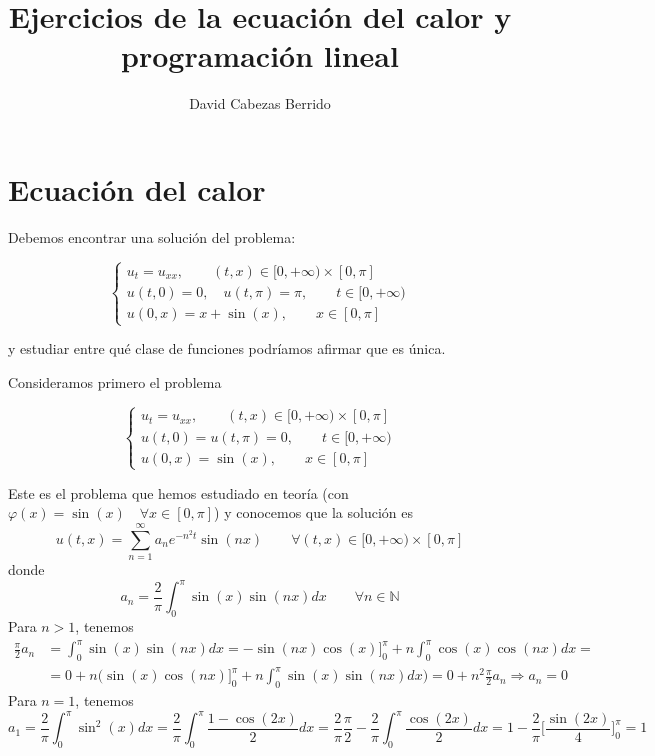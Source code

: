 \documentclass[a4]{article}
\title{Ejercicios de la ecuación del calor y programación lineal}
\author{David Cabezas Berrido}
\date{\vspace{-4mm}}
\begin{document}
\maketitle

\section{Ecuación del calor}

Debemos encontrar una solución del problema:

\begin{equation} \label{eq:enunciado}
  \begin{cases}
    u_t=u_{xx}, \qquad (t,x)\in [0,+\infty)\times [0,\pi] \\
    u(t,0)=0,\quad u(t,\pi)=\pi, \qquad t\in [0,+\infty) \\
    u(0,x)=x+\sin(x), \qquad x\in [0,\pi]
  \end{cases}
\end{equation}

y estudiar entre qué clase de funciones podríamos afirmar que es
única.

\vspace{4mm}

Consideramos primero el problema

\begin{equation} \label{eq:homogeneo}
  \begin{cases}
    u_t=u_{xx}, \qquad (t,x)\in [0,+\infty)\times [0,\pi] \\
    u(t,0)=u(t,\pi)=0   , \qquad t\in [0,+\infty) \\
    u(0,x)=\sin(x), \qquad x\in [0,\pi]
  \end{cases}
\end{equation}

Este es el problema que hemos estudiado en teoría (con
$\varphi(x)=\sin(x)\quad\forall x\in[0,\pi]$) y conocemos que la
solución es
\begin{equation} \label{eq:sol-homogeneo}
  u(t,x)=\sum_{n=1}^\infty a_n e^{-n^2 t}\sin(nx)\qquad\forall(t,x)\in[0,+\infty)\times [0,\pi]
\end{equation}
donde
\begin{equation} \label{eq:an}
  a_n=\frac{2}{\pi}\int_0^\pi\sin(x)\sin(nx)dx\qquad\forall n\in\mathbb{N}
\end{equation}
Para $n>1$, tenemos
\begin{align*}
  \frac{\pi}{2}a_n&=\int_0^\pi\sin(x)\sin(nx)dx=-\sin(nx)\cos(x)\bigg]_0^\pi+n\int_0^\pi\cos(x)\cos(nx)dx=\\&= 0+n\bigg(\sin(x)\cos(nx)\bigg]_0^\pi+n\int_0^\pi\sin(x)\sin(nx)dx\bigg)=0+n^2\frac{\pi}{2}a_n \Longrightarrow a_n=0
\end{align*}
Para $n=1$, tenemos
\[a_1=\frac{2}{\pi}\int_0^\pi\sin^2(x)dx=\frac{2}{\pi}\int_0^\pi\frac{1-\cos(2x)}{2}dx=\frac{2}{\pi}\frac{\pi}{2}-\frac{2}{\pi}\int_0^\pi\frac{\cos(2x)}{2}dx=1-\frac{2}{\pi}\bigg[\frac{\sin(2x)}{4}\bigg]_{0}^{\pi}=1\]
\end{document}
